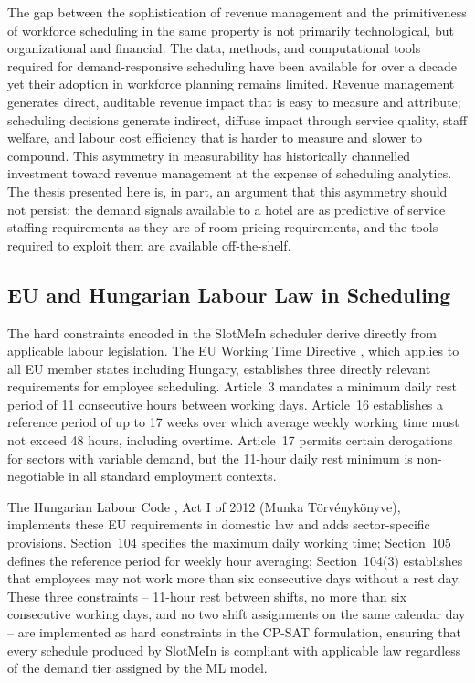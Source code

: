 \documentclass[12pt,a4paper,oneside]{article}
\begin{document}
The gap between the sophistication of revenue management and the primitiveness of workforce scheduling in the same property is not primarily technological, but organizational and financial. The data, methods, and computational tools required for demand-responsive scheduling have been available for over a decade yet their adoption in workforce planning remains limited. Revenue management generates direct, auditable revenue impact that is easy to measure and attribute; scheduling decisions generate indirect, diffuse impact through service quality, staff welfare, and labour cost efficiency that is harder to measure and slower to compound. This asymmetry in measurability has historically channelled investment toward revenue management at the expense of scheduling analytics. The thesis presented here is, in part, an argument that this asymmetry should not persist: the demand signals available to a hotel are as predictive of service staffing requirements as they are of room pricing requirements, and the tools required to exploit them are available off-the-shelf.

\subsection{EU and Hungarian Labour Law in Scheduling}

The hard constraints encoded in the SlotMeIn scheduler derive directly from applicable labour legislation. The EU Working Time Directive \citep{wtd2003}, which applies to all EU member states including Hungary, establishes three directly relevant requirements for employee scheduling. Article~3 mandates a minimum daily rest period of 11 consecutive hours between working days. Article~16 establishes a reference period of up to 17 weeks over which average weekly working time must not exceed 48 hours, including overtime. Article~17 permits certain derogations for sectors with variable demand, but the 11-hour daily rest minimum is non-negotiable in all standard employment contexts.

The Hungarian Labour Code \citep{hungarian2012}, Act I of 2012 (Munka T\"{o}rv\'{e}nyk\"{o}nyve), implements these EU requirements in domestic law and adds sector-specific provisions. Section~104 specifies the maximum daily working time; Section~105 defines the reference period for weekly hour averaging; Section~104(3) establishes that employees may not work more than six consecutive days without a rest day. These three constraints -- 11-hour rest between shifts, no more than six consecutive working days, and no two shift assignments on the same calendar day -- are implemented as hard constraints in the CP-SAT formulation, ensuring that every schedule produced by SlotMeIn is compliant with applicable law regardless of the demand tier assigned by the ML model.
\end{document}
